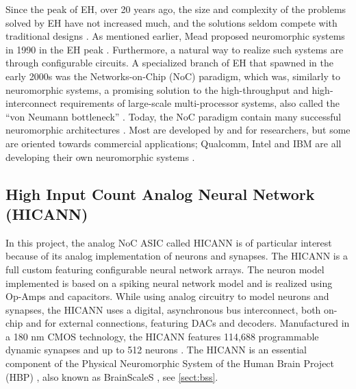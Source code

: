 Since the peak of EH, over 20 years ago, the size and complexity of the problems solved by EH have not increased much, and the solutions seldom compete with traditional designs \cite{haddow_challenges_2011}.
As mentioned earlier, Mead proposed neuromorphic systems in 1990 in the EH peak \cite{mead_neuromorphic_1990}.
Furthermore, a natural way to realize such systems are through configurable circuits.
A specialized branch of EH that spawned in the early 2000s was the Networks-on-Chip (NoC) paradigm,
which was, similarly to neuromorphic systems, a promising solution to the high-throughput and high-interconnect requirements of large-scale multi-processor systems, also called the  ``von Neumann bottleneck'' \cite{benini_networks_2002}\cite{trefzer_evolvable_2015}\cite{mead_neuromorphic_1990}.
Today, the NoC paradigm contain many successful neuromorphic architectures \cite{trefzer_evolvable_2015}.
Most are developed by and for researchers, but some are oriented towards commercial applications;
Qualcomm, Intel and IBM are all developing their own neuromorphic systems \cite{meier_mixed-signal_2015}\cite{davies_loihi_2018}\cite{debole_truenorth_2019}\cite{trefzer_evolvable_2015}.

\subsection{High Input Count Analog Neural Network (HICANN)} \label{sect:hicann}
In this project, the analog NoC ASIC called HICANN is of particular interest\cite{schemmel_wafer-scale_2008} because of its analog implementation of neurons and synapses.
 The HICANN is a full custom featuring configurable neural network arrays.
The neuron model implemented is based on a spiking neural network model and is realized using Op-Amps and capacitors.
While using analog circuitry to model neurons and synapses, the HICANN uses a digital, asynchronous bus interconnect, both on-chip and for external connections, featuring DACs and decoders.
Manufactured in a 180 nm CMOS technology, the HICANN features 114,688 programmable dynamic synapses and up to 512 neurons \cite{zoschke_full_2017}.
\cite{haddow_challenges_2011}\cite{trefzer_evolvable_2015}
The HICANN is an essential component of the Physical Neuromorphic System of the Human Brain Project (HBP) \cite{markram_introducing_2011}, also known as BrainScaleS \cite{meier_mixed-signal_2015}, see \vref{sect:bss}.


















